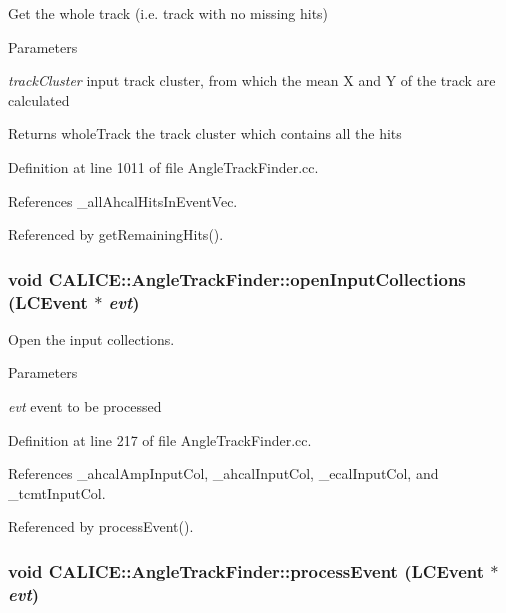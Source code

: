 Get the whole track (i.e. track with no missing hits) 
\begin{DoxyParams}{Parameters}
\item[{\em trackCluster}]input track cluster, from which the mean X and Y of the track are calculated \end{DoxyParams}
\begin{DoxyReturn}{Returns}
wholeTrack the track cluster which contains all the hits 
\end{DoxyReturn}


Definition at line 1011 of file AngleTrackFinder.cc.

References \_\-allAhcalHitsInEventVec.

Referenced by getRemainingHits().
\subsubsection[{openInputCollections}]{\setlength{\rightskip}{0pt plus 5cm}void CALICE::AngleTrackFinder::openInputCollections (LCEvent $\ast$ {\em evt})\hspace{0.3cm}{\ttfamily  [private]}}\label{classCALICE_1_1AngleTrackFinder_a684d9afc2a36e32a3fa037f8befcc23f}


Open the input collections. 
\begin{DoxyParams}{Parameters}
\item[{\em evt}]event to be processed \end{DoxyParams}


Definition at line 217 of file AngleTrackFinder.cc.

References \_\-ahcalAmpInputCol, \_\-ahcalInputCol, \_\-ecalInputCol, and \_\-tcmtInputCol.

Referenced by processEvent().
\subsubsection[{processEvent}]{\setlength{\rightskip}{0pt plus 5cm}void CALICE::AngleTrackFinder::processEvent (LCEvent $\ast$ {\em evt})\hspace{0.3cm}{\ttfamily  [virtual]}}\label{classCALICE_1_1AngleTrackFinder_a212ba3e4cfe268d1941c294df5aba7b1}



